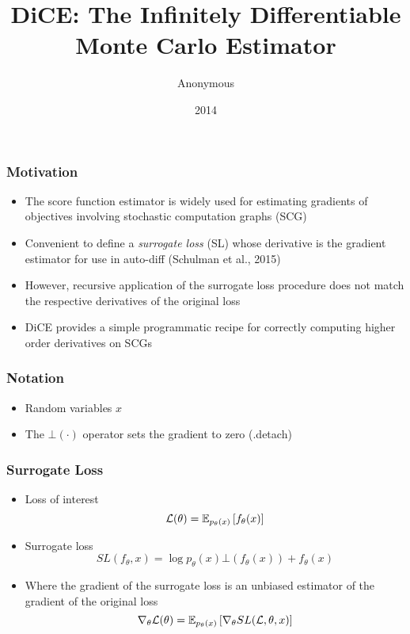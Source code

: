 \documentclass{beamer}
\title{DiCE: The Infinitely Differentiable Monte Carlo Estimator}
\author{Anonymous}
\institute{Overleaf}
\date{2014}
\begin{document}
 
\frame{\titlepage}
 
\begin{frame}
\frametitle{Motivation}
\begin{itemize}
\item The score function estimator is widely used for estimating gradients of
objectives involving stochastic computation graphs (SCG)
\item Convenient to define a \textit{surrogate loss} (SL)
whose derivative is the gradient estimator for use in auto-diff (Schulman et al., 2015) 
\item However, recursive application of the surrogate loss procedure does not match the respective
derivatives of the original loss
\item DiCE provides a simple programmatic recipe for correctly computing
higher order derivatives on SCGs
\end{itemize}
\end{frame}

\begin{frame}
\frametitle{Notation}
\begin{itemize}
\item Random variables $x$
\item The $\bot(\cdot)$ operator sets the gradient to zero (.detach)
\end{itemize}
\end{frame}

\begin{frame}
\frametitle{Surrogate Loss}
\begin{itemize}
\item Loss of interest 
$$\mathcal{L}(\theta) = \mathbb{E}_{p_\theta(x)}\left[f_\theta(x)\right]$$
\item Surrogate loss
$$SL(f_\theta, x) = \log p_\theta(x)\bot(f_\theta(x)) + f_\theta(x)$$
\item Where the gradient of the surrogate loss is an unbiased estimator of the gradient of 
the original loss
$$\nabla_\theta \mathcal{L}(\theta) = \mathbb{E}_{p_\theta(x)}\left[\nabla_\theta SL(\mathcal{L}, \theta, x)\right]$$
\end{itemize}
\end{frame}
\end{document}
